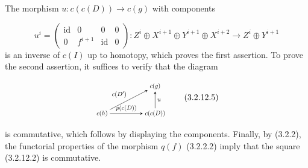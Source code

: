 The morphism $u\colon c(c(D))\longrightarrow c(g)$ with components

\begin{equation}
  u^i=
  \begin{pmatrix}
    \operatorname{id}&0&0&0\\
    0&f^{i+1}&\operatorname{id}&0
  \end{pmatrix}
  \colon Z^i\oplus X^{i+1}\oplus Y^{i+1}\oplus X^{i+2}
  \longrightarrow Z^i\oplus Y^{i+1}
  \tag{3.2.12.4}
\end{equation}
is an inverse of $c(I)$ up to homotopy, which proves the first assertion.
To prove the second assertion, it suffices to verify that the diagram

\begin{equation}
  \begin{tikzpicture}[>=stealth,baseline=(current bounding box.center),scale=0.74,
    every node/.style={transform shape}]
    \node (Ch) at (0,0) {$c(h)$};
    \node (Cg) at (3.0,1.55) {$c(g)$};
    \node (CcD) at (3.0,0) {$c(c(D))$};
    \draw[->] (Ch) -- node[above left] {$c(D')$} (Cg);
    \draw[->] (CcD) -- node[right] {$u$} (Cg);
    \draw[->] (Ch) -- node[above] {$p(c(D))$} (CcD);
  \end{tikzpicture}
  \tag{3.2.12.5}
\end{equation}

is commutative, which follows by displaying the components. Finally, by
(3.2.2), the functorial properties of the morphism $q(f)$ (3.2.2.2)
imply that the square (3.2.12.2) is commutative.
\endgroup

